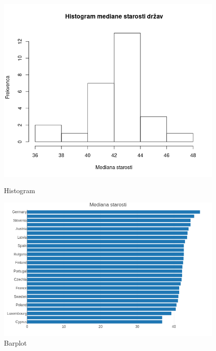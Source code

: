\documentclass[a4paper,11pt]{article}
\begin{document}
\begin{figure}[!htb]
   \begin{minipage}{0.5\textwidth}
     \centering
     \includegraphics[width=1\linewidth]{histogram_mediane_starosti}
     \caption{Histogram}\label{Fig:Data1}
   \end{minipage}\hfill
   \begin{minipage}{0.5\textwidth}
     \centering
     \includegraphics[width=1\linewidth]{barplot_mediane_starosti}
     \caption{Barplot}\label{Fig:Data2}
   \end{minipage}
\end{figure}
\end{document}
